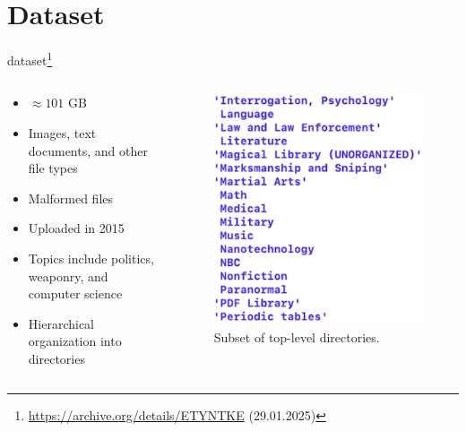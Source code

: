 \section{Dataset}

\begin{frame}{\ac{dataset}\footnote{\url{https://archive.org/details/ETYNTKE} (29.01.2025)}}
    \begin{columns}[T] %
        \begin{column}{0.6\textwidth}
             \begin{itemize}
                \item $\approx 101$ GB 
                \item Images, text documents, and other file types
                \item Malformed files
                \item Uploaded in 2015
                \item Topics include politics, weaponry, and computer science
                \item Hierarchical organization into directories
            \end{itemize}
        \end{column}

        \begin{column}{0.25\textwidth}
            \begin{figure}
                \includegraphics[width=\linewidth]{images/screenshot_data.png}
                \caption{Subset of top-level directories.} %
            \end{figure}
   
        \end{column}
    \end{columns}
\end{frame}

